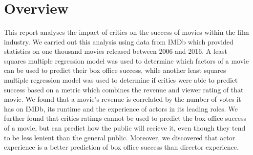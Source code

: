 \section{Overview}
    \paragraph{}
        This report analyses the impact of critics on the success of movies within the
            film industry.
        We carried out this analysis using data from IMDb which provided statistics on
            one thousand movies released between 2006 and 2016.
        A least squares multiple regression model was used to determine which factors
            of a movie can be used to predict their box office success, while another least
            squares multiple regression model was used to determine if critics were able to
            predict success based on a metric which combines the revenue and viewer rating
            of that movie.
        We found that a movie's revenue is correlated by the number of votes it has on
            IMDb, its runtime and the experience of actors in its leading roles.
        We further found that critics ratings cannot be used to predict the box office
            success of a movie, but can predict how the public will recieve it, even though
            they tend to be less lenient than the general public.
        Moreover, we discovered that actor experience is a better prediction of box
            office success than director experience.

